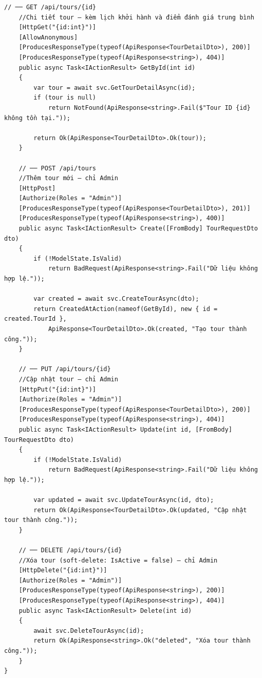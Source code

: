 \begin{lstlisting}[style=csharp, caption={ToursController --- các action chính}]
    // ── GET /api/tours/{id}
    //Chi tiết tour — kèm lịch khởi hành và điểm đánh giá trung bình
    [HttpGet("{id:int}")]
    [AllowAnonymous]
    [ProducesResponseType(typeof(ApiResponse<TourDetailDto>), 200)]
    [ProducesResponseType(typeof(ApiResponse<string>), 404)]
    public async Task<IActionResult> GetById(int id)
    {
        var tour = await svc.GetTourDetailAsync(id);
        if (tour is null)
            return NotFound(ApiResponse<string>.Fail($"Tour ID {id} không tồn tại."));

        return Ok(ApiResponse<TourDetailDto>.Ok(tour));
    }

    // ── POST /api/tours
    //Thêm tour mới — chỉ Admin
    [HttpPost]
    [Authorize(Roles = "Admin")]
    [ProducesResponseType(typeof(ApiResponse<TourDetailDto>), 201)]
    [ProducesResponseType(typeof(ApiResponse<string>), 400)]
    public async Task<IActionResult> Create([FromBody] TourRequestDto dto)
    {
        if (!ModelState.IsValid)
            return BadRequest(ApiResponse<string>.Fail("Dữ liệu không hợp lệ."));

        var created = await svc.CreateTourAsync(dto);
        return CreatedAtAction(nameof(GetById), new { id = created.TourId },
            ApiResponse<TourDetailDto>.Ok(created, "Tạo tour thành công."));
    }

    // ── PUT /api/tours/{id}
    //Cập nhật tour — chỉ Admin
    [HttpPut("{id:int}")]
    [Authorize(Roles = "Admin")]
    [ProducesResponseType(typeof(ApiResponse<TourDetailDto>), 200)]
    [ProducesResponseType(typeof(ApiResponse<string>), 404)]
    public async Task<IActionResult> Update(int id, [FromBody] TourRequestDto dto)
    {
        if (!ModelState.IsValid)
            return BadRequest(ApiResponse<string>.Fail("Dữ liệu không hợp lệ."));

        var updated = await svc.UpdateTourAsync(id, dto);
        return Ok(ApiResponse<TourDetailDto>.Ok(updated, "Cập nhật tour thành công."));
    }

    // ── DELETE /api/tours/{id}
    //Xóa tour (soft-delete: IsActive = false) — chỉ Admin
    [HttpDelete("{id:int}")]
    [Authorize(Roles = "Admin")]
    [ProducesResponseType(typeof(ApiResponse<string>), 200)]
    [ProducesResponseType(typeof(ApiResponse<string>), 404)]
    public async Task<IActionResult> Delete(int id)
    {
        await svc.DeleteTourAsync(id);
        return Ok(ApiResponse<string>.Ok("deleted", "Xóa tour thành công."));
    }
}
\end{lstlisting}

